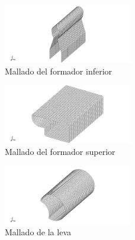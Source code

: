 \begin{figure}[!h]
\centering
\includegraphics[width=0.5\textwidth]{src/ch3/mesh_fi.png}
\caption{Mallado del formador inferior}
\label{fig:mesh_fi}
\end{figure}

\begin{figure}[!h]
\centering
\includegraphics[width=0.5\textwidth]{src/ch3/mesh_fs.png}
\caption{Mallado del formador superior}
\label{fig:mesh_fi}
\end{figure}

\begin{figure}[!h]
\centering
\includegraphics[width=0.5\textwidth]{src/ch3/mesh_leva.png}
\caption{Mallado de la leva}
\label{fig:mesh_fi}
\end{figure}



